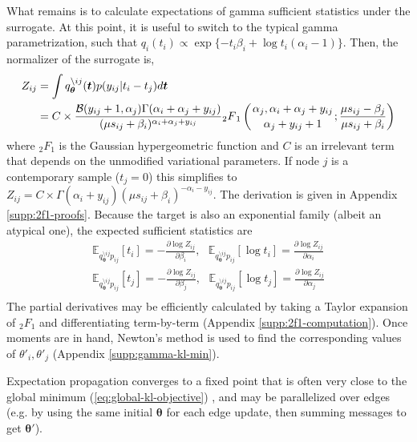 \documentclass{article}
\begin{document}
What remains is to calculate expectations of gamma sufficient statistics under the surrogate. At this point, it is useful to switch to the typical gamma parametrization, such that $q_{i}(t_i) \propto \exp \{ -t_i \beta_i + \log t_i (\alpha_i - 1) \}$. Then, the normalizer of the surrogate is,
\[
\begin{aligned}
Z_{ij} & = \int q^{\setminus ij}_{\bm \theta}(\bm t) p(y_{ij} | t_i - t_j) d\bm t \\
& = C \times \frac{\mathcal{B}(y_{ij} + 1, \alpha_j) \Gamma(\alpha_i + \alpha_j + y_{ij})}{(\mu s_{ij} + \beta_i)^{\alpha_i + \alpha_j + y_{ij}}} {_2}F{_1}\left( {{\alpha_j,  \alpha_i + \alpha_j + y_{ij} } \atop {\alpha_j + y_{ij} + 1}}; \frac{\mu s_{ij} - \beta_j}{\mu s_{ij} + \beta_i} \right)
\end{aligned}
\]
where ${_2}F{_1}$ is the Gaussian hypergeometric function and $C$ is an irrelevant term that depends on the unmodified variational parameters. If node $j$ is a contemporary sample ($t_j = 0$) this simplifies to $Z_{ij} = C \times \Gamma(\alpha_i + y_{ij}) (\mu s_{ij} + \beta_i)^{-\alpha_i - y_{ij}}$. The derivation is given in Appendix \ref{supp:2f1-proofs}. Because the target is also an exponential family (albeit an atypical one), the expected sufficient statistics are
\[
\begin{aligned}
\mathbb{E}_{q^{\setminus ij}_{\bm \theta} p_{ij}}[t_i] = -\frac{\partial \log Z_{ij}}{\partial \beta_i},~~~ \mathbb{E}_{q^{\setminus ij}_{\bm \theta} p_{ij}}[\log t_i] = \frac{\partial \log Z_{ij}}{\partial \alpha_i} \\
\mathbb{E}_{q^{\setminus ij}_{\bm \theta} p_{ij}}[t_j] = -\frac{\partial \log Z_{ij}}{\partial \beta_j},~~~ \mathbb{E}_{q^{\setminus ij}_{\bm \theta} p_{ij}}[\log t_j] = \frac{\partial \log Z_{ij}}{\partial \alpha_j} \\
\end{aligned}
\] 
The partial derivatives may be efficiently calculated by taking a Taylor expansion of ${_2}F{_1}$ and differentiating term-by-term (Appendix \ref{supp:2f1-computation}). Once moments are in hand, Newton's method is used to find the corresponding values of $\theta'_i, \theta'_j$ (Appendix \ref{supp:gamma-kl-min}).

Expectation propagation converges to a fixed point that is often very close to the global minimum (\ref{eq:global-kl-objective}) \cite{cunningham2014gaussian}, and may be parallelized over edges (e.g. by using the same initial $\bm \theta$ for each edge update, then summing messages to get $\bm \theta'$).
\end{document}

